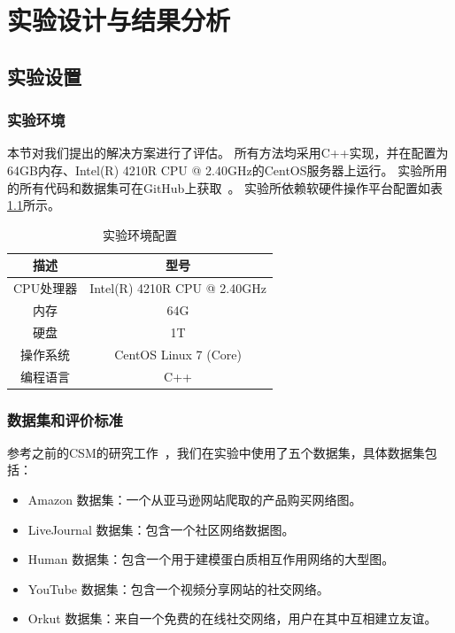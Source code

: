\def\itk{KiSD}
\def\pm{PBSM}
\chapter{实验设计与结果分析}
\label{ch5:experiment}
\section{实验设置}
\subsection{实验环境}
本节对我们提出的解决方案进行了评估。
所有方法均采用C++实现，并在配置为64GB内存、Intel(R) 4210R CPU @ 2.40GHz的CentOS服务器上运行。
实验所用的所有代码和数据集可在GitHub上获取~\cite{code-git-csmtok}。
实验所依赖软硬件操作平台配置如表\ref{table:setup}所示。
\begin{table}[H]
    \centering
    \caption{实验环境配置}
    \label{table:setup}
    \begin{tabular}{cc}
        \toprule
        描述   & 型号  \\
        \midrule
        CPU处理器 & Intel(R) 4210R CPU @ 2.40GHz\\
        内存 & 64G \\
        硬盘 & 1T\\
        操作系统 & CentOS Linux 7 (Core)\\
        编程语言 & C++ \\
        \bottomrule
    \end{tabular}
\end{table}

\subsection{数据集和评价标准}
\label{ss-sec:dataset}
参考之前的CSM的研究工作~\cite{csm-survey:DBLP:journals/pvldb/SunSLH22,static-sm:DBLP:conf/sigmod/Sun020}，我们在实验中使用了五个数据集，具体数据集包括：
\begin{itemize}
\item Amazon 数据集：一个从亚马逊网站爬取的产品购买网络图。
\item LiveJournal 数据集：包含一个社区网络数据图。
\item Human 数据集：包含一个用于建模蛋白质相互作用网络的大型图。
\item YouTube 数据集：包含一个视频分享网站的社交网络。
\item Orkut 数据集：来自一个免费的在线社交网络，用户在其中互相建立友谊。
\end{itemize}   

